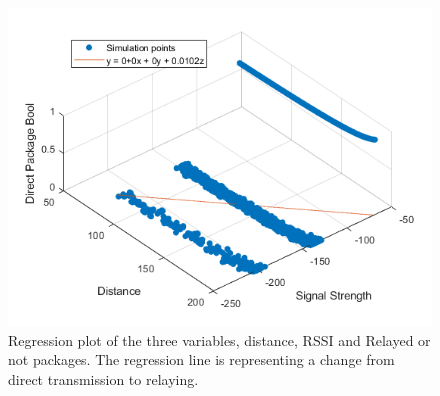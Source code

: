 \begin{figure}[H]
	\centering
	\includegraphics[width=\linewidth]{theory/protocolDecisionExample/fig/regressionPlot.png}
	\caption{Regression plot of the three variables, distance, RSSI and Relayed or not packages. The regression line is representing a change from direct transmission to relaying.}
	\label{fig:regressionPlot}
\end{figure}